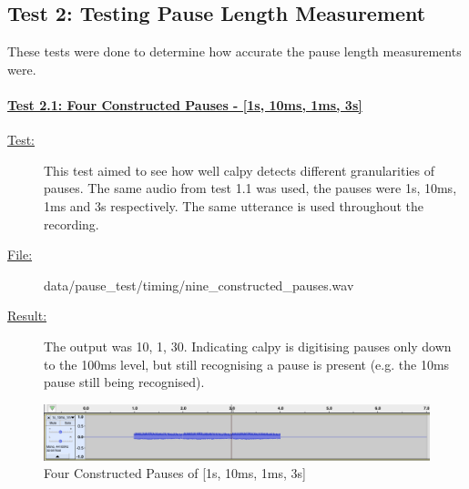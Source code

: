 \newpage
\subsection{Test 2: Testing Pause Length Measurement}
These tests were done to determine how accurate the pause length measurements were. 

\paragraph{\underline{Test 2.1: Four Constructed Pauses - [1s, 10ms, 1ms, 3s]}}
\begin{description}
	\item[\underline{Test:}] This test aimed to see how well calpy detects different granularities of pauses. 
						The same audio from test 1.1 was used, the pauses were 1s, 10ms, 1ms and 3s respectively.
						The same utterance is used throughout the recording.
	\item[\underline{File:}] data/pause\_test/timing/nine\_constructed\_pauses.wav
	\item[\underline{Result:}] The output was 10, 1, 30. Indicating calpy is digitising pauses only down to the 100ms level, 
						but still recognising a pause is present (e.g. the 10ms pause still being recognised).
\end{description}
\begin{figure}[h]
	\center
	\includegraphics[scale=0.3]{src/main-matter/results/preliminary-testing/detection/1s_10ms_1ms_3s}
	\caption{Four Constructed Pauses of [1s, 10ms, 1ms, 3s]}
	\label{fig:021}
\end{figure}



